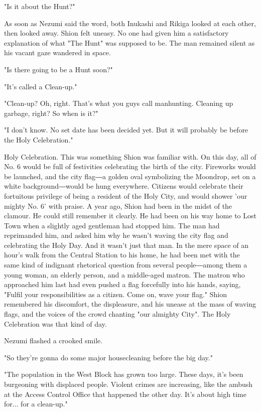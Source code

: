 "Is it about the Hunt?"

As soon as Nezumi said the word, both Inukashi and Rikiga looked at each
other, then looked away. Shion felt uneasy. No one had given him a
satisfactory explanation of what "The Hunt" was supposed to be. The man
remained silent as his vacant gaze wandered in space.

"Is there going to be a Hunt soon?"

"It's called a Clean-up."

"Clean-up? Oh, right. That's what you guys call manhunting. Cleaning up
garbage, right? So when is it?"

"I don't know. No set date has been decided yet. But it will probably be
before the Holy Celebration."

Holy Celebration. This was something Shion was familiar with. On this
day, all of No. 6 would be full of festivities celebrating the birth of
the city. Fireworks would be launched, and the city flag―a golden oval
symbolizing the Moondrop, set on a white background―would be hung
everywhere. Citizens would celebrate their fortuitous privilege of being
a resident of the Holy City, and would shower 'our mighty No. 6' with
praise. A year ago, Shion had been in the midst of the clamour. He could
still remember it clearly. He had been on his way home to Lost Town when
a slightly aged gentleman had stopped him. The man had reprimanded him,
and asked him why he wasn't waving the city flag and celebrating the
Holy Day. And it wasn't just that man. In the mere space of an hour's
walk from the Central Station to his home, he had been met with the same
kind of indignant rhetorical question from several people―among them a
young woman, an elderly person, and a middle-aged matron. The matron who
approached him last had even pushed a flag forcefully into his hands,
saying, "Fulfil your responsibilities as a citizen. Come on, wave your
flag." Shion remembered his discomfort, the displeasure, and his unease
at the mass of waving flags, and the voices of the crowd chanting "our
almighty City". The Holy Celebration was that kind of day.

Nezumi flashed a crooked smile.

"So they're gonna do some major housecleaning before the big day."

"The population in the West Block has grown too large. These days, it's
been burgeoning with displaced people. Violent crimes are increasing,
like the ambush at the Access Control Office that happened the other
day. It's about high time for... for a clean-up."

